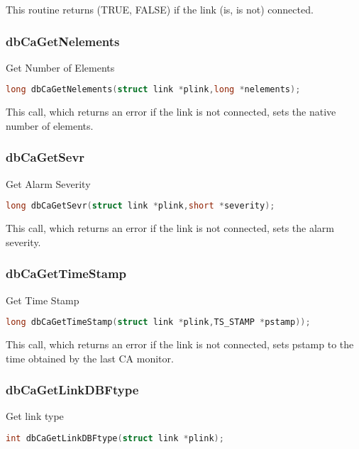 This routine returns (TRUE, FALSE) if the link (is, is not) connected.

\subsubsection{dbCaGetNelements}

Get Number of Elements

\begin{lstlisting}[language=C]
long dbCaGetNelements(struct link *plink,long *nelements);
\end{lstlisting}

This call, which returns an error if the link is not connected, sets the native number of elements.

\subsubsection{dbCaGetSevr}

Get Alarm Severity

\begin{lstlisting}[language=C]
long dbCaGetSevr(struct link *plink,short *severity);
\end{lstlisting}

This call, which returns an error if the link is not connected, sets the alarm severity.

\subsubsection{dbCaGetTimeStamp}

Get Time Stamp

\begin{lstlisting}[language=C]
long dbCaGetTimeStamp(struct link *plink,TS_STAMP *pstamp));
\end{lstlisting}

This call, which returns an error if the link is not connected, sets pstamp to the time obtained by the last CA monitor.

\subsubsection{dbCaGetLinkDBFtype}

Get link type

\begin{lstlisting}[language=C]
int dbCaGetLinkDBFtype(struct link *plink);
\end{lstlisting}

